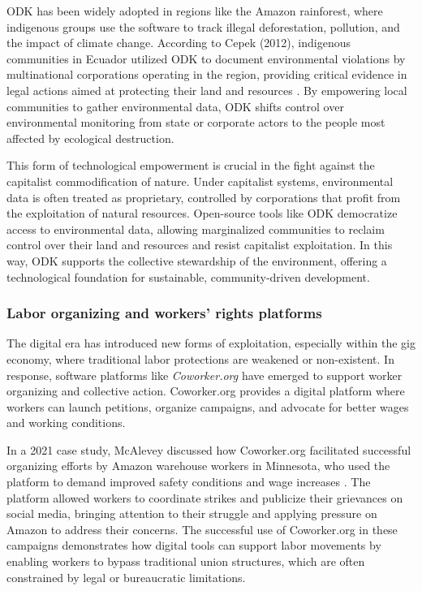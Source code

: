 \begin{refsection}
ODK has been widely adopted in regions like the Amazon rainforest, where indigenous groups use the software to track illegal deforestation, pollution, and the impact of climate change. According to Cepek (2012), indigenous communities in Ecuador utilized ODK to document environmental violations by multinational corporations operating in the region, providing critical evidence in legal actions aimed at protecting their land and resources \cite[pp.~42-45]{cepek2012}. By empowering local communities to gather environmental data, ODK shifts control over environmental monitoring from state or corporate actors to the people most affected by ecological destruction.

This form of technological empowerment is crucial in the fight against the capitalist commodification of nature. Under capitalist systems, environmental data is often treated as proprietary, controlled by corporations that profit from the exploitation of natural resources. Open-source tools like ODK democratize access to environmental data, allowing marginalized communities to reclaim control over their land and resources and resist capitalist exploitation. In this way, ODK supports the collective stewardship of the environment, offering a technological foundation for sustainable, community-driven development.

\subsubsection{Labor organizing and workers' rights platforms}

The digital era has introduced new forms of exploitation, especially within the gig economy, where traditional labor protections are weakened or non-existent. In response, software platforms like \textit{Coworker.org} have emerged to support worker organizing and collective action. Coworker.org provides a digital platform where workers can launch petitions, organize campaigns, and advocate for better wages and working conditions.

In a 2021 case study, McAlevey discussed how Coworker.org facilitated successful organizing efforts by Amazon warehouse workers in Minnesota, who used the platform to demand improved safety conditions and wage increases \cite[pp.~115-118]{mcalevey2021}. The platform allowed workers to coordinate strikes and publicize their grievances on social media, bringing attention to their struggle and applying pressure on Amazon to address their concerns. The successful use of Coworker.org in these campaigns demonstrates how digital tools can support labor movements by enabling workers to bypass traditional union structures, which are often constrained by legal or bureaucratic limitations.


\end{refsection}
